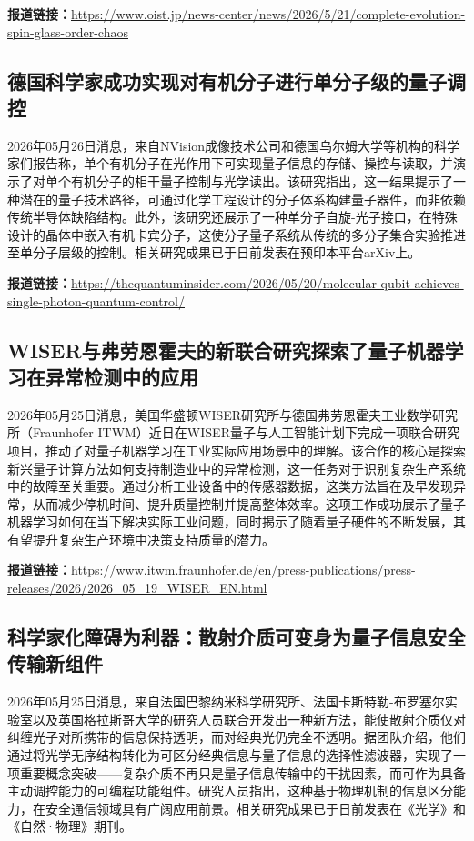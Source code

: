\documentclass[12pt,a4paper]{ctexart}
\begin{document}
\noindent\textbf{报道链接：}\url{https://www.oist.jp/news-center/news/2026/5/21/complete-evolution-spin-glass-order-chaos}

\subsection{ 德国科学家成功实现对有机分子进行单分子级的量子调控 }

2026年05月26日消息，来自NVision成像技术公司和德国乌尔姆大学等机构的科学家们报告称，单个有机分子在光作用下可实现量子信息的存储、操控与读取，并演示了对单个有机分子的相干量子控制与光学读出。该研究指出，这一结果提示了一种潜在的量子技术路径，可通过化学工程设计的分子体系构建量子器件，而非依赖传统半导体缺陷结构。此外，该研究还展示了一种单分子自旋-光子接口，在特殊设计的晶体中嵌入有机卡宾分子，这使分子量子系统从传统的多分子集合实验推进至单分子层级的控制。相关研究成果已于日前发表在预印本平台arXiv上。

\noindent\textbf{报道链接：}\url{https://thequantuminsider.com/2026/05/20/molecular-qubit-achieves-single-photon-quantum-control/}

\subsection{ WISER与弗劳恩霍夫的新联合研究探索了量子机器学习在异常检测中的应用 }

2026年05月25日消息，美国华盛顿WISER研究所与德国弗劳恩霍夫工业数学研究所（Fraunhofer ITWM）近日在WISER量子与人工智能计划下完成一项联合研究项目，推动了对量子机器学习在工业实际应用场景中的理解。该合作的核心是探索新兴量子计算方法如何支持制造业中的异常检测，这一任务对于识别复杂生产系统中的故障至关重要。通过分析工业设备中的传感器数据，这类方法旨在及早发现异常，从而减少停机时间、提升质量控制并提高整体效率。这项工作成功展示了量子机器学习如何在当下解决实际工业问题，同时揭示了随着量子硬件的不断发展，其有望提升复杂生产环境中决策支持质量的潜力。

\noindent\textbf{报道链接：}\url{https://www.itwm.fraunhofer.de/en/press-publications/press-releases/2026/2026\_05\_19\_WISER\_EN.html}

\subsection{ 科学家化障碍为利器：散射介质可变身为量子信息安全传输新组件 }

2026年05月25日消息，来自法国巴黎纳米科学研究所、法国卡斯特勒-布罗塞尔实验室以及英国格拉斯哥大学的研究人员联合开发出一种新方法，能使散射介质仅对纠缠光子对所携带的信息保持透明，而对经典光仍完全不透明。据团队介绍，他们通过将光学无序结构转化为可区分经典信息与量子信息的选择性滤波器，实现了一项重要概念突破——复杂介质不再只是量子信息传输中的干扰因素，而可作为具备主动调控能力的可编程功能组件。研究人员指出，这种基于物理机制的信息区分能力，在安全通信领域具有广阔应用前景。相关研究成果已于日前发表在《光学》和《自然·物理》期刊。
\end{document}
